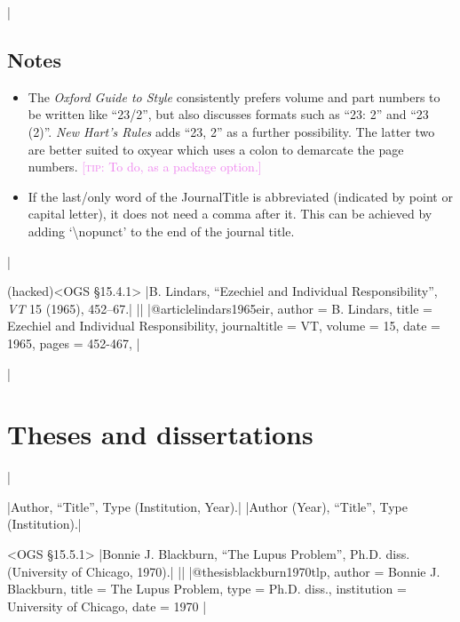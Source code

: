 \documentclass[extrafontsizes,11pt,a4paper,oneside]{memoir}
\newcommand*{\code}[1]{`\textsf{#1}'}
\newcommand*{\aside}[1]{\textcolor{violet}{[\textsc{tip:} #1]}}
\begin{document}

\todoc|
\section{Notes}

\begin{itemize}
  \item The \emph{Oxford Guide to Style} consistently prefers volume and part numbers to be written like \enquote{23/2}, but also discusses formats such as \enquote{23: 2} and \enquote{23 (2)}. \emph{New Hart's Rules} adds \enquote{23, 2} as a further possibility. The latter two are better suited to \textsf{oxyear} which uses a colon to demarcate the page numbers. \aside{To do, as a package option.}
  
  \item If the last\slash only word of the JournalTitle is abbreviated (indicated by point or capital letter), it does not need a comma after it. This can be achieved by adding \code{\textbackslash nopunct} to the end of the journal title.
\end{itemize}
|

\bibexample(hacked)<OGS \S15.4.1>
|B. Lindars, \enquote{Ezechiel and Individual Responsibility}, \emph{VT} 15 (1965), 452--67.|%
||%
|@article{lindars1965eir,
  author = {B. Lindars},
  title = {Ezechiel and Individual Responsibility},
  journaltitle = {VT\nopunct},
  volume = {15},
  date = {1965},
  pages = {452-467},
}|

\todoc|
\chapter{Theses and dissertations}\label{sec:thesis}
|

\specs
|Author, \enquote{Title}, Type (Institution, Year).|%
|Author (Year), \enquote{Title}, Type (Institution).|

\bibexample<OGS \S15.5.1>
|Bonnie J. Blackburn, \enquote{The Lupus Problem}, Ph.D. diss. (University of Chicago, 1970).|%
||%
|@thesis{blackburn1970tlp,
  author = {Bonnie J. Blackburn},
  title = {The Lupus Problem},
  type = {Ph.D. diss.},
  institution = {University of Chicago},
  date = {1970}
}|
\end{document}

